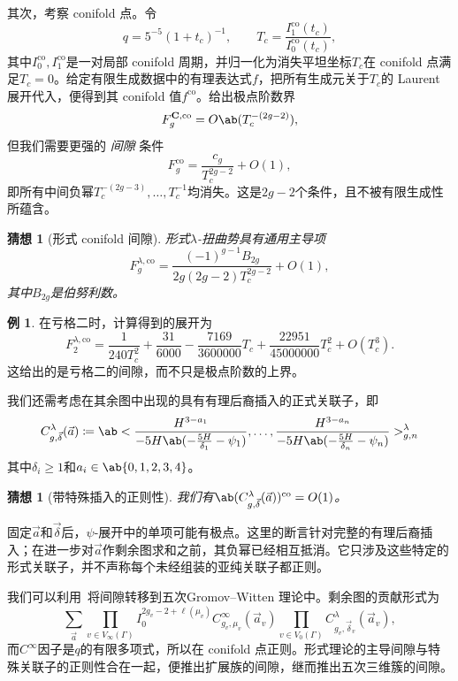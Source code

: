 \documentclass{amsart}
\newtheorem{conj}[thm]{猜想}
\theoremstyle{definition}
\newtheorem{exm}[thm]{例}
\theoremstyle{remark}
\theoremstyle{plain}
\theoremstyle{definition}
\theoremstyle{remark}
\newcommand{\mbf}[1]{\mathbf{#1}}
\newcommand{\mr}[1]{\mathrm{#1}}
\newcommand{\1}{\mathbf{1}}
\newcommand{\2}{\mathbf{2}}
\newcommand{\3}{\mathbf{3}}
\begin{document}
其次，考察 conifold 点。令
\[ q = 5^{-5}(1+t_c)^{-1}, \qquad T_c = \frac{I_1^{\mr{co}}(t_c)}{I_0^{\mr{co}}(t_c)}, \]
其中\(I_0^{\mr{co}}, I_1^{\mr{co}}\)是一对局部 conifold 周期，并归一化为消失平坦坐标\(T_c\)在 conifold 点满足\(T_c=0\)。给定有限生成数据中的有理表达式\(f\)，把所有生成元关于\(T_c\)的 Laurent 展开代入，便得到其 conifold 值\(f^{\mr{co}}\)。给出极点阶数界
\[ F_g^{\mbf{C},\mr{co}} = O\ab(T_c^{-(2g-2)}), \]
但我们需要更强的 \textit{间隙} 条件
\[ F_g^{\mr{co}} = \frac{c_g}{T_c^{2g-2}} + O(1), \]
即所有中间负幂\(T_c^{-(2g-3)}, \ldots, T_c^{-1}\)均消失。这是\(2g-2\)个条件，且不被有限生成性所蕴含。

\begin{conj}[形式 conifold 间隙]%
\label{conj:formal conifold gap}
形式\(\lambda\)-扭曲势具有通用主导项
    \[ F_g^{\lambda,\mr{co}} = \frac{(-1)^{g-1}B_{2g}}{2g(2g-2)T_c^{2g-2}} + O(1), \]
其中\(B_{2g}\)是伯努利数。
\end{conj}

\begin{exm}
在亏格二时，计算得到的展开为
    \[ F_2^{\lambda,\mr{co}} = \frac{1}{240T_c^2} + \frac{31}{6000} - \frac{7169}{3600000}T_c + \frac{22951}{45000000}T_c^2 + O(T_c^3). \]
    这给出的是亏格二的间隙，而不只是极点阶数的上界。
\end{exm}

我们还需考虑在其余图中出现的具有有理后裔插入的正式关联子，即
\[ C^{\lambda}_{g,\vec{\delta}}(\vec{a}) \coloneqq \ab< \frac{H^{3-a_1}}{-5H\ab(-\frac{5H}{\delta_1}-\psi_1)}, \ldots, \frac{H^{3-a_n}}{-5H\ab(-\frac{5H}{\delta_n}-\psi_n)}>^{\lambda}_{g,n} \]
其中\(\delta_i \geq 1\)和\(a_i \in \ab\{0,1,2,3,4\}\)。

\begin{conj}[带特殊插入的正则性]%
\label{conj:special correlator regularity}
我们有\(\ab(C^{\lambda}_{g,\vec{\delta}}(\vec{a}))^{\mr{co}} = O(1)\)。
\end{conj}

固定\(\vec{a}\)和\(\vec{\delta}\)后，\(\psi\)-展开中的单项可能有极点。这里的断言针对完整的有理后裔插入；在进一步对\(\vec{a}\)作剩余图求和之前，其负幂已经相互抵消。它只涉及这些特定的形式关联子，并不声称每个未经组装的亚纯关联子都正则。

我们可以利用~将间隙转移到五次Gromov--Witten 理论中。剩余图的贡献形式为
\[ \sum_{\vec{a}} \prod_{v \in V_{\infty}(\Gamma)}I_0^{2g_v-2+\ell(\mu_v)}C^{\infty}_{g_v,\mu_v}(\vec{a}_v)\prod_{v\in V_0(\Gamma)}C^{\lambda}_{g_v,\vec{\delta}_v}(\vec{a}_v), \]
而\(C^{\infty}\)因子是\(q\)的有限多项式，所以在 conifold 点正则。形式理论的主导间隙与特殊关联子的正则性合在一起，便推出扩展族的间隙，继而推出五次三维簇的间隙。
\end{document}
